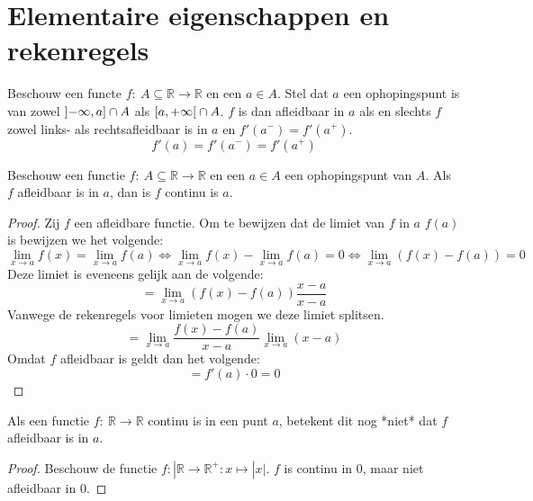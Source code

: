 \documentclass[main.tex]{subfiles}
\begin{document}
\section{Elementaire eigenschappen en rekenregels}
\label{sec:elem-eigensch-en}

\begin{bpr}
  Beschouw een functe $f:\ A \subseteq \mathbb{R} \rightarrow \mathbb{R}$ en een $a\in A$.
  Stel dat $a$ een ophopingspunt is van zowel $\interval[open left]{-\infty}{a} \cap A$ als $\interval[open right]{a}{+\infty} \cap A$.
  $f$ is dan afleidbaar in $a$ als en slechts $f$ zowel links- als rechtsafleidbaar is in $a$ en $f'(a^{-})=f'(a^{+})$.
  \[ f'(a) = f'(a^{-})=f'(a^{+}) \]
\end{bpr}

\begin{bpr}
  \label{pr:afleidbaar-dan-continu}
  Beschouw een functie $f:\ A \subseteq \mathbb{R} \rightarrow \mathbb{R}$ en een $a\in A$ een ophopingspunt van $A$.
  Als $f$ afleidbaar is in $a$, dan is $f$ continu is $a$.

  \begin{proof}
    Zij $f$ een afleidbare functie.
    Om te bewijzen dat de limiet van $f$ in $a$ $f(a)$ is bewijzen we het volgende:
    \[  \lim_{x \rightarrow a}f(x)=\lim_{x \rightarrow a}f(a) \Leftrightarrow \lim_{x \rightarrow a}f(x)-\lim_{x \rightarrow a}f(a) = 0 \Leftrightarrow  \lim_{x \rightarrow a}\left(f(x)-f(a)\right) = 0 \]
    Deze limiet is eveneens gelijk aan de volgende:
    \[ = \lim_{x \rightarrow a}\left(f(x)-f(a)\right)\frac{x-a}{x-a} \]
    Vanwege de rekenregels voor limieten mogen we deze limiet splitsen.
    \[ = \lim_{x \rightarrow a}\frac{f(x)-f(a)}{x-a}\lim_{x \rightarrow a}(x-a) \]
    Omdat $f$ afleidbaar is geldt dan het volgende:
    \[ = f'(a)\cdot 0 = 0 \]
  \end{proof}
\end{bpr}

\begin{tvb}
  Als een functie $f:\ \mathbb{R} \rightarrow \mathbb{R}$ continu is in een punt $a$, betekent dit nog *niet* dat $f$ afleidbaar is in $a$.

  \begin{proof}
    Beschouw de functie $f:| \mathbb{R} \rightarrow \mathbb{R}^{+}: x \mapsto |x|$.
    $f$ is continu in $0$, maar niet afleidbaar in $0$.
  \end{proof}
\end{tvb}
\end{document}
